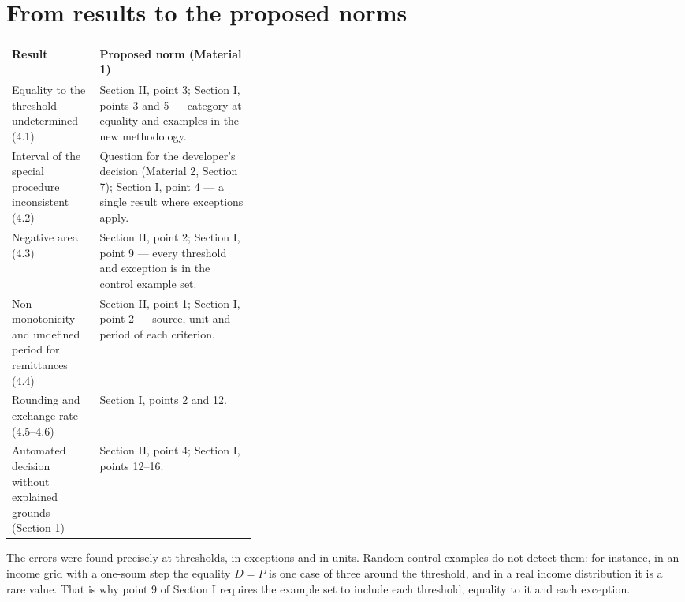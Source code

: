 \documentclass[12pt,a4paper]{extarticle}
\begin{document}
\section{From results to the proposed norms}
\begingroup\fontsize{12bp}{14.4bp}\selectfont
\begin{longtable}{L{0.36\linewidth} L{\tabcolsep}}
\toprule
Result & Proposed norm (Material 1)\\\midrule\endhead
Equality to the threshold undetermined (4.1) & Section II, point 3; Section I, points 3 and 5 — category at equality and examples in the new methodology.\\\midrule
Interval of the special procedure inconsistent (4.2) & Question for the developer’s decision (Material 2, Section 7); Section I, point 4 — a single result where exceptions apply.\\\midrule
Negative area (4.3) & Section II, point 2; Section I, point 9 — every threshold and exception is in the control example set.\\\midrule
Non-monotonicity and undefined period for remittances (4.4) & Section II, point 1; Section I, point 2 — source, unit and period of each criterion.\\\midrule
Rounding and exchange rate (4.5–4.6) & Section I, points 2 and 12.\\\midrule
Automated decision without explained grounds (Section 1) & Section II, point 4; Section I, points 12–16.\\
\bottomrule
\end{longtable}\endgroup

The errors were found precisely at thresholds, in exceptions and in units. Random control examples do not detect them: for instance, in an income grid with a one-soum step the equality $D=P$ is one case of three around the threshold, and in a real income distribution it is a rare value. That is why point 9 of Section I requires the example set to include each threshold, equality to it and each exception.
\end{document}
